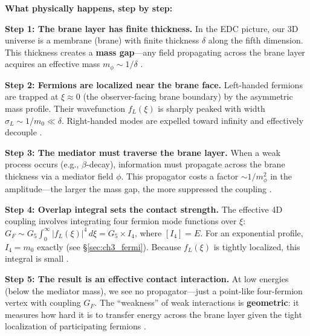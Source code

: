 
\begin{tcolorbox}[colback=green!5!white, colframe=green!50!black,
    title=\textbf{The Fermi Constant in EDC: Physical Process}]
\textbf{What physically happens, step by step:}

\textbf{Step 1: The brane layer has finite thickness.}
In the EDC picture, our 3D universe is a membrane (brane) with finite thickness $\delta$
along the fifth dimension. This thickness creates a \textbf{mass gap}---any field
propagating across the brane layer acquires an effective mass $m_\phi \sim 1/\delta$ \tagP{}.

\textbf{Step 2: Fermions are localized near the brane face.}
Left-handed fermions are trapped at $\xi \approx 0$ (the observer-facing brane boundary)
by the asymmetric mass profile. Their wavefunction $f_L(\xi)$ is sharply peaked with
width $\sigma_L \sim 1/m_0 \ll \delta$. Right-handed modes are expelled toward
infinity and effectively decouple \tagDc{}.

\textbf{Step 3: The mediator must traverse the brane layer.}
When a weak process occurs (e.g., $\beta$-decay), information must propagate across
the brane thickness via a mediator field $\phi$. This propagator costs a factor
$\sim 1/m_\phi^2$ in the amplitude---the larger the mass gap, the more suppressed
the coupling \tagDc{}.

\textbf{Step 4: Overlap integral sets the contact strength.}
The effective 4D coupling involves integrating four fermion mode functions over $\xi$:
$G_F \sim G_5 \int_0^\infty |f_L(\xi)|^4 \, d\xi = G_5 \times I_4$, where $[I_4] = E$.
For an exponential profile, $I_4 = m_0$ exactly (see \S\ref{sec:ch3_fermi}).
Because $f_L(\xi)$ is tightly localized, this integral is small \tagP{}.

\textbf{Step 5: The result is an effective contact interaction.}
At low energies (below the mediator mass), we see no propagator---just a point-like
four-fermion vertex with coupling $G_F$. The ``weakness'' of weak interactions is
\textbf{geometric}: it measures how hard it is to transfer energy across the
brane layer given the tight localization of participating fermions \tagI{}.
\end{tcolorbox}


